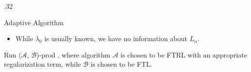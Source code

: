 \documentclass[final]{beamer} %
\newcommand{\cA}{\mathcal{A}}
\newcommand{\cB}{\mathcal{B}}
\begin{document}
\begin{frame}[c]
\begin{columns}[t,totalwidth=\textwidth]
\begin{column} {.32\textwidth}
		
%
		\begin{block}{Adaptive Algorithm}
			\begin{itemize}
				\item While $\lambda_0$ is usually known, we have no information about $L_n$.
			\end{itemize}
			{}
			\vspace{0.5cm}
			Run ($\cA$, $\cB$)-prod \citep{sani2014exploiting}, where algorithm
			$\cA$ is chosen to be FTRL with an appropriate regularization term, 
			while $\cB$ is chosen to be FTL. 
		\end{block}
		
		

\end{column}
\end{columns}
\end{frame}
\end{document}
